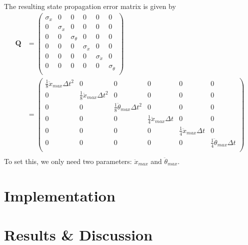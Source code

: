 \documentclass[12pt]{article}
\begin{document}
The resulting state propagation error matrix is given by
\begin{equation}
\begin{split}
\mathbf{Q}
    & =
    \begin{pmatrix}
        \sigma_x & 0 & 0 & 0 & 0 & 0 \\
        0 & \sigma_x & 0 & 0 & 0 & 0 \\
        0 & 0 & \sigma_{\theta} & 0 & 0 & 0 \\
        0 & 0 & 0 & \sigma_{\dot{x}} & 0 & 0 \\
        0 & 0 & 0 & 0 & \sigma_{\dot{x}} & 0 \\
        0 & 0 & 0 & 0 & 0 & \sigma_{\dot{\theta}} \\
    \end{pmatrix}
    \\
    & =
    \begin{pmatrix}
        \frac{1}{8} \ddot{x}_{max} \Delta{t}^2 & 0 & 0 & 0 & 0 & 0 \\
        0 & \frac{1}{8} \ddot{x}_{max} \Delta{t}^2 & 0 & 0 & 0 & 0 \\
        0 & 0 & \frac{1}{8} \ddot{\theta}_{max} \Delta{t}^2 & 0 & 0 & 0 \\
        0 & 0 & 0 & \frac{1}{4} \ddot{x}_{max} \Delta{t} & 0 & 0 \\
        0 & 0 & 0 & 0 & \frac{1}{4} \ddot{x}_{max} \Delta{t} & 0 \\
        0 & 0 & 0 & 0 & 0 & \frac{1}{4} \ddot{\theta}_{max} \Delta{t} \\
    \end{pmatrix}
    \\
\end{split}
\end{equation}
To set this, we only need two parameters: $\ddot{x}_{max}$ and $\ddot{\theta}_{max}$.


\section{Implementation}

\section{Results \& Discussion}
\end{document}
